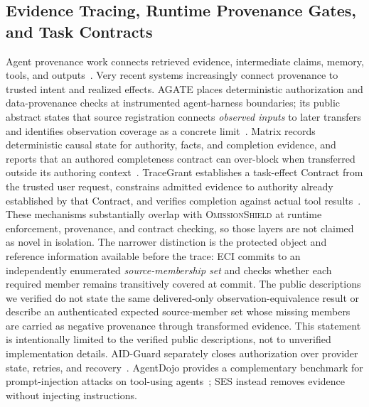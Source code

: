 \documentclass[journal,compsoc]{IEEEtran}
\newcommand{\system}{\textsc{OmissionShield}}
\begin{document}
\subsection{Evidence Tracing, Runtime Provenance Gates, and Task Contracts}
Agent provenance work connects retrieved evidence, intermediate claims, memory, tools, and outputs~\cite{wang2026traces}. Very recent systems increasingly connect provenance to trusted intent and realized effects. AGATE places deterministic authorization and data-provenance checks at instrumented agent-harness boundaries; its public abstract states that source registration connects \emph{observed inputs} to later transfers and identifies observation coverage as a concrete limit~\cite{zhang2026agate}. Matrix records deterministic causal state for authority, facts, and completion evidence, and reports that an authored completeness contract can over-block when transferred outside its authoring context~\cite{salas2026governed}. TraceGrant establishes a task-effect Contract from the trusted user request, constrains admitted evidence to authority already established by that Contract, and verifies completion against actual tool results~\cite{tracegrant2026}. These mechanisms substantially overlap with \system{} at runtime enforcement, provenance, and contract checking, so those layers are not claimed as novel in isolation. The narrower distinction is the protected object and reference information available before the trace: ECI commits to an independently enumerated \emph{source-membership set} and checks whether each required member remains transitively covered at commit. The public descriptions we verified do not state the same delivered-only observation-equivalence result or describe an authenticated expected source-member set whose missing members are carried as negative provenance through transformed evidence. This statement is intentionally limited to the verified public descriptions, not to unverified implementation details. AID-Guard separately closes authorization over provider state, retries, and recovery~\cite{aidguard2026}. AgentDojo provides a complementary benchmark for prompt-injection attacks on tool-using agents~\cite{debenedetti2024agentdojo}; SES instead removes evidence without injecting instructions.
\end{document}
